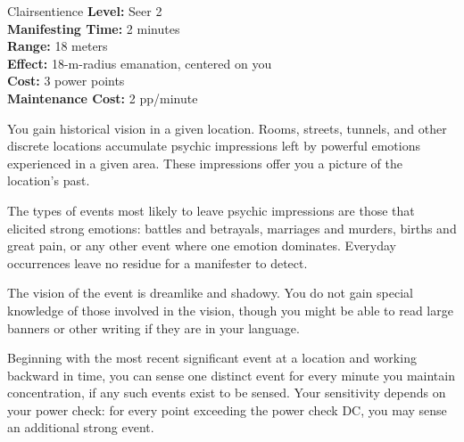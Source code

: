 {Clairsentience}
{
	\textbf{Level:}
	Seer 2\\
	\textbf{Manifesting Time:}
	2 minutes\\
	\textbf{Range:}
	18 meters\\
	\textbf{Effect:}
	18-m-radius emanation, centered on you\\
	\textbf{Cost:}
	3 power points\\
	\textbf{Maintenance Cost:}
	2 pp/minute\\
}
{
	You gain historical vision in a given location. Rooms, streets, tunnels, and other discrete locations accumulate psychic impressions left by powerful emotions experienced in a given area. These impressions offer you a picture of the location's past.

	The types of events most likely to leave psychic impressions are those that elicited strong emotions: battles and betrayals, marriages and murders, births and great pain, or any other event where one emotion dominates. Everyday occurrences leave no residue for a manifester to detect.

	The vision of the event is dreamlike and shadowy. You do not gain special knowledge of those involved in the vision, though you might be able to read large banners or other writing if they are in your language.

	Beginning with the most recent significant event at a location and working backward in time, you can sense one distinct event for every minute you maintain concentration, if any such events exist to be sensed. Your sensitivity depends on your power check: for every point exceeding the power check DC, you may sense an additional strong event.
}